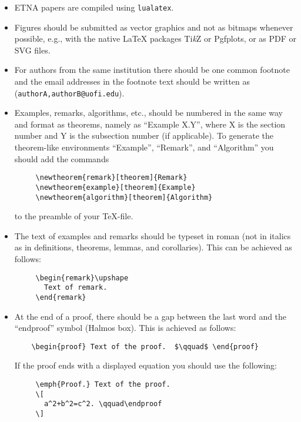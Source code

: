 \documentclass[parskip]{scrartcl}
\begin{document}
\begin{itemize}
\item ETNA papers are compiled using \texttt{lualatex}.
\item Figures should be submitted as vector graphics and not as bitmaps whenever
possible, e.g., with the native \LaTeX{} packages Ti\textit{k}Z or Pgfplots, or
  as PDF or SVG files.

\item For authors from the same institution there should be one
common footnote and the email addresses in the footnote text
should be written as (\texttt{{authorA,authorB}@uofi.edu}).

%
%
\item Examples, remarks, algorithms, etc., should be numbered in the same way
  and format as theorems, namely as ``Example X.Y'', where X is the section
  number and Y is the subsection number (if applicable). To generate the
  theorem-like environments ``Example'', ``Remark'', and ``Algorithm'' you
  should add the commands
\begin{verbatim}
     \newtheorem{remark}[theorem]{Remark}
     \newtheorem{example}[theorem]{Example}
     \newtheorem{algorithm}[theorem]{Algorithm}
\end{verbatim}
to the preamble of your \TeX-file.
%
\item The text of examples and remarks should be typeset in roman (not in
  italics as in definitions, theorems, lemmas, and corollaries).  This can be
  achieved as follows:
\begin{verbatim}
     \begin{remark}\upshape
       Text of remark.
     \end{remark}
\end{verbatim}
%
\item  At the end of a proof, there should be a gap between the last word and
  the ``endproof'' symbol (Halmos box). This is achieved as follows:
%
\begin{verbatim}
    \begin{proof} Text of the proof.  $\qquad$ \end{proof}
\end{verbatim}
%
If the proof ends with a displayed equation you should use the following:
\begin{verbatim}
     \emph{Proof.} Text of the proof.
     \[
       a^2+b^2=c^2. \qquad\endproof
     \]
\end{verbatim}


\end{itemize}
\end{document}
